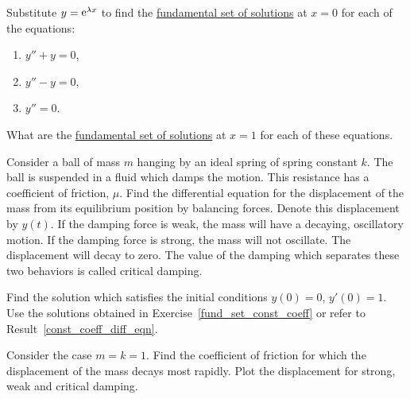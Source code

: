 {\begin{Exercise}
\end{Exercise}


\begin{Exercise}
  \label{exercise fund set x=0 x=1}
  Substitute $y = \mathop{\mathrm{e}}\nolimits^{\lambda x}$ to find the 
  \hyperref[section The Fundamental Set of Solutions]
    {fundamental set of solutions}
  at $x=0$ for each of the equations:
  \begin{enumerate}
  \item $y''+ y = 0$,
  \item $y''- y = 0$,
  \item $y'' = 0$.
  \end{enumerate}
  What are the 
  \hyperref[section The Fundamental Set of Solutions]
    {fundamental set of solutions}
  at $x=1$ for each of these equations.

\end{Exercise}




\begin{Exercise}
  \label{exercise damped harmonic motion}
  Consider a ball of mass $m$ hanging by an ideal spring of spring constant
  $k$.  The ball is suspended in a fluid which damps the motion.  
  This resistance has a coefficient of friction, $\mu$.  Find 
  the differential equation for the displacement of the mass from its 
  equilibrium position by balancing forces.  Denote this displacement by 
  $y(t)$.  If the damping force is weak, the mass will have a decaying, 
  oscillatory motion.  If the damping force is strong, the mass will not
  oscillate.  The displacement will decay to zero.  The value of the damping
  which separates these two behaviors is called critical damping.

  Find the solution which satisfies the initial conditions $y(0) = 0$, 
  $y'(0) = 1$.  Use the solutions obtained in 
  Exercise~\ref{fund_set_const_coeff} or refer to 
  Result~\ref{const_coeff_diff_eqn}.

  Consider the case $m = k = 1$.  Find the coefficient of friction for which 
  the displacement of the mass decays most rapidly. 
  Plot the displacement for strong, weak and critical damping.

\end{Exercise}









}
